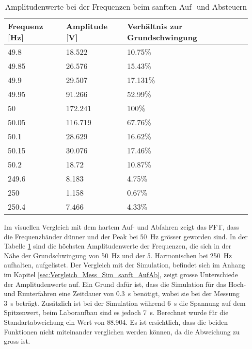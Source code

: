 \begin{table}[ht!]
	\centering
	\begin{tabular}{|l|l|l|}
		\hline
		Frequenz {[}Hz{]} & Amplitude {[}V{]} & Verhältnis zur Grundschwingung \\ \hline
		49.8              & 18.522            & 10.75\%                        \\ \hline
		49.85             & 26.576            & 15.43\%                        \\ \hline
		49.9              & 29.507            & 17.131\%                       \\ \hline
		49.95             & 91.266            & 52.99\%                        \\ \hline
		50                & 172.241           & 100\%                          \\ \hline
		50.05             & 116.719           & 67.76\%                        \\ \hline
		50.1              & 28.629            & 16.62\%                        \\ \hline
		50.15             & 30.076            & 17.46\%                        \\ \hline
		50.2              & 18.72             & 10.87\%                        \\ \hline
		249.6             & 8.183             & 4.75\%                         \\ \hline
		250               & 1.158             & 0.67\%                         \\ \hline
		250.4             & 7.466             & 4.33\%                         \\ \hline
	\end{tabular}
\caption{Amplitudenwerte bei der Frequenzen beim sanften Auf- und Absteuern}\label{tab:Mess_Spannung_AufAb_sanft}
\end{table}

Im visuellen Vergleich mit dem hartem Auf- und Abfahren zeigt das FFT, dass die Frequenzbänder dünner und der Peak bei \SI{50}{Hz} grösser geworden sind. In der Tabelle \ref{tab:Mess_Spannung_AufAb_sanft} sind die höchsten Amplitudenwerte der Frequenzen, die sich in der Nähe der Grundschwingung von \SI{50}{Hz} und der 5. Harmonischen bei \SI{250}{Hz} aufhalten, aufgelistet. Der Vergleich mit der Simulation, befindet sich im Anhang im Kapitel \ref{sec:Vergleich_Mess_Sim_sanft_AufAb}, zeigt grosse Unterschiede der Amplitudenwerte auf. Ein Grund dafür ist, dass die Simulation für das Hoch- und Runterfahren eine Zeitdauer von \SI{0.3}{s} benötigt, wobei sie bei der Messung \SI{3}{s} beträgt. Zusätzlich ist bei der Simulation während \SI{6}{s} die Spannung auf dem Spitzenwert, beim Laboraufbau sind es jedoch \SI{7}{s}.  Berechnet wurde für die Standartabweichung ein Wert von 88.904. Es ist ersichtlich, dass die beiden Funktionen nicht miteinander verglichen werden können, da die Abweichung zu gross ist.



